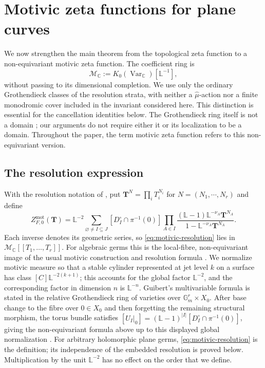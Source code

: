 \documentclass[12pt]{amsart}
\numberwithin{equation}{section}
\theoremstyle{plain}
\theoremstyle{definition}
\theoremstyle{remark}
\theoremstyle{definition}
\newcommand{\C}{\mathbb C}
\newcommand{\Lef}{\mathbb L}
\newcommand{\Mmot}{\mathcal M_{\mathbb C}}
\newcommand{\motzeta}{Z^{\mathrm{mot}}_{F,0}}
\begin{document}

\section{Motivic zeta functions for plane curves}\label{sec:motivic-comparison}

We now strengthen the main theorem from the topological zeta function to a non-equivariant motivic zeta function. The coefficient ring is
\begin{equation*}
\Mmot:=K_0(\operatorname{Var}_{\C})[\Lef^{-1}],
\end{equation*}
without passing to its dimensional completion. We use only the ordinary Grothendieck classes of the resolution strata, with neither a $\widehat\mu$-action nor a finite monodromic cover included in the invariant considered here. This distinction is essential for the cancellation identities below. The Grothendieck ring itself is not a domain \cite{Poonen2002}; our arguments do not require either it or its localization to be a domain. Throughout the paper, the term motivic zeta function refers to this non-equivariant version.

\subsection{The resolution expression}

With the resolution notation of , put $\mathbf T^N=\prod_iT_i^{N_i}$ for $N=(N_1,\cdots,N_r)$ and define
\begin{equation}\label{eq:motivic-resolution}
 \motzeta(\mathbf T)=\Lef^{-2}\sum_{\varnothing\ne I\subseteq J}[D_I^\circ\cap\pi^{-1}(0)]\prod_{A\in I}\frac{(\Lef-1)\Lef^{-\nu_A}\mathbf T^{N_A}}{1-\Lef^{-\nu_A}\mathbf T^{N_A}}.
\end{equation}
Each inverse denotes its geometric series, so \eqref{eq:motivic-resolution} lies in $\Mmot[\![T_1,\ldots,T_r]\!]$. For algebraic germs this is the local-fibre, non-equivariant image of the usual motivic construction and resolution formula \cite[Theorem~2.2.1]{DenefLoeser1998}. We normalize motivic measure so that a stable cylinder represented at jet level $k$ on a surface has class $[C]\Lef^{-2(k+1)}$; this accounts for the global factor $\Lef^{-2}$, and the corresponding factor in dimension $n$ is $\Lef^{-n}$. Guibert's multivariable formula is stated in the relative Grothendieck ring of varieties over $\mathbb G_m^r\times X_0$. After base change to the fibre over $0\in X_0$ and then forgetting the remaining structural morphism, the torus bundle satisfies $[U_I|_0]=(\Lef-1)^{|I|}[D_I^\circ\cap\pi^{-1}(0)]$, giving the non-equivariant formula above up to this displayed global normalization \cite[D\'efinition~4.1.1 and Th\'eor\`eme~4.1.2]{Guibert2002}. For arbitrary holomorphic plane germs, \eqref{eq:motivic-resolution} is the definition; its independence of the embedded resolution is proved below. Multiplication by the unit $\Lef^{-2}$ has no effect on the order that we define.
\end{document}
